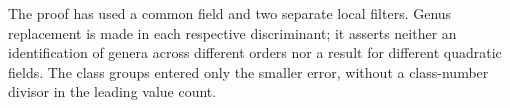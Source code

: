 The proof has used a common field and two separate local filters.
Genus replacement is made in each respective discriminant; it asserts
neither an identification of genera across different orders nor a
result for different quadratic fields. The class groups entered only
the smaller error, without a class-number divisor in the leading
value count.
